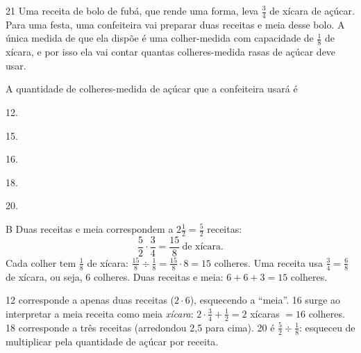 \begin{questaoinedita}{2}{1}
Uma receita de bolo de fubá, que rende uma forma, leva $\frac{3}{4}$ de xícara de açúcar. Para uma
festa, uma confeiteira vai preparar duas receitas e meia desse bolo. A única medida de que ela dispõe
é uma colher-medida com capacidade de $\frac{1}{8}$ de xícara, e por isso ela vai contar quantas
colheres-medida rasas de açúcar deve usar.

A quantidade de colheres-medida de açúcar que a confeiteira usará é
\begin{alternativas*}[5]
\item 12.
\item 15.
\item 16.
\item 18.
\item 20.
\end{alternativas*}
\end{questaoinedita}
\begin{resolucao}{B}
 Duas receitas e meia correspondem a $2\frac{1}{2}=\frac{5}{2}$ receitas:
\[\frac{5}{2}\cdot\frac{3}{4}=\frac{15}{8}\ \text{de xícara}.\]
 Cada colher tem $\frac{1}{8}$ de xícara:
$\frac{15}{8}\div\frac{1}{8}=\frac{15}{8}\cdot 8=15$ colheres.
 Uma receita usa $\frac{3}{4}=\frac{6}{8}$ de xícara, ou seja, 6 colheres. Duas
receitas e meia: $6+6+3=15$ colheres.
\begin{distratores}
 12 corresponde a apenas duas receitas ($2\cdot 6$), esquecendo a ``meia''.
 16 surge ao interpretar a meia receita como meia \emph{xícara}: $2\cdot\frac{3}{4}+\frac{1}{2}=2$
xícaras $=16$ colheres.
 18 corresponde a três receitas (arredondou 2,5 para cima).
 20 é $\frac{5}{2}\div\frac{1}{8}$: esqueceu de multiplicar pela quantidade de açúcar por receita.
\end{distratores}
\end{resolucao}

